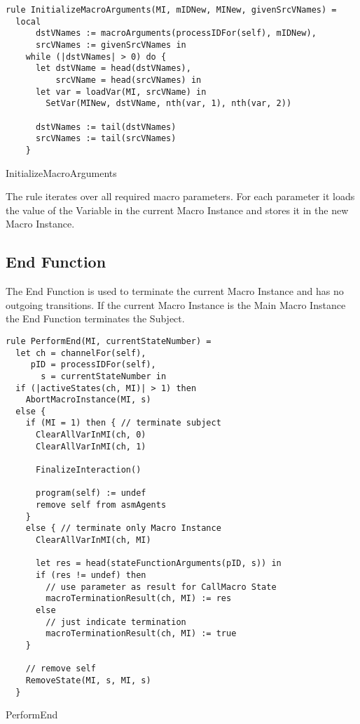 \begin{listing}[H]
\begin{verbatim}
rule InitializeMacroArguments(MI, mIDNew, MINew, givenSrcVNames) =
  local
      dstVNames := macroArguments(processIDFor(self), mIDNew),
      srcVNames := givenSrcVNames in
    while (|dstVNames| > 0) do {
      let dstVName = head(dstVNames),
          srcVName = head(srcVNames) in
      let var = loadVar(MI, srcVName) in
        SetVar(MINew, dstVName, nth(var, 1), nth(var, 2))

      dstVNames := tail(dstVNames)
      srcVNames := tail(srcVNames)
    }
\end{verbatim}
\caption{InitializeMacroArguments}
\label{lst:shortasm:InitializeMacroArguments}
\end{listing}


The  rule iterates over all required macro
parameters. For each parameter it loads the value of the Variable in the current Macro Instance and stores it in the
new Macro Instance.




\subsection{End Function}

The End Function is used to terminate the current Macro Instance and has no outgoing transitions.
If the current Macro Instance is the Main Macro Instance the End Function terminates the Subject.


\begin{listing}[H]
\begin{verbatim}
rule PerformEnd(MI, currentStateNumber) =
  let ch = channelFor(self),
     pID = processIDFor(self),
       s = currentStateNumber in
  if (|activeStates(ch, MI)| > 1) then
    AbortMacroInstance(MI, s)
  else {
    if (MI = 1) then { // terminate subject
      ClearAllVarInMI(ch, 0)
      ClearAllVarInMI(ch, 1)

      FinalizeInteraction()

      program(self) := undef
      remove self from asmAgents
    }
    else { // terminate only Macro Instance
      ClearAllVarInMI(ch, MI)

      let res = head(stateFunctionArguments(pID, s)) in
      if (res != undef) then
        // use parameter as result for CallMacro State
        macroTerminationResult(ch, MI) := res
      else
        // just indicate termination
        macroTerminationResult(ch, MI) := true
    }

    // remove self
    RemoveState(MI, s, MI, s)
  }
\end{verbatim}
\caption{PerformEnd}
\label{lst:shortasm:PerformEnd}
\end{listing}


